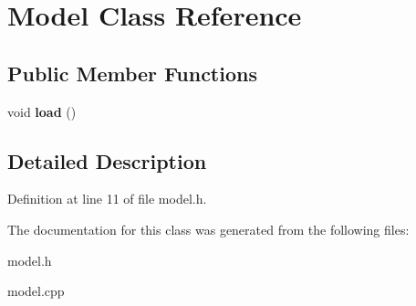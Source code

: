 \hypertarget{classModel}{}\section{Model Class Reference}
\label{classModel}
\subsection*{Public Member Functions}
\begin{DoxyCompactItemize}
\item 
\mbox{\label{classModel_a937f7f22c88f8c6ca549b7bb98190563}} 
void {\bfseries load} ()
\end{DoxyCompactItemize}


\subsection{Detailed Description}


Definition at line 11 of file model.\+h.



The documentation for this class was generated from the following files\+:\begin{DoxyCompactItemize}
\item 
model.\+h\item 
model.\+cpp\end{DoxyCompactItemize}

